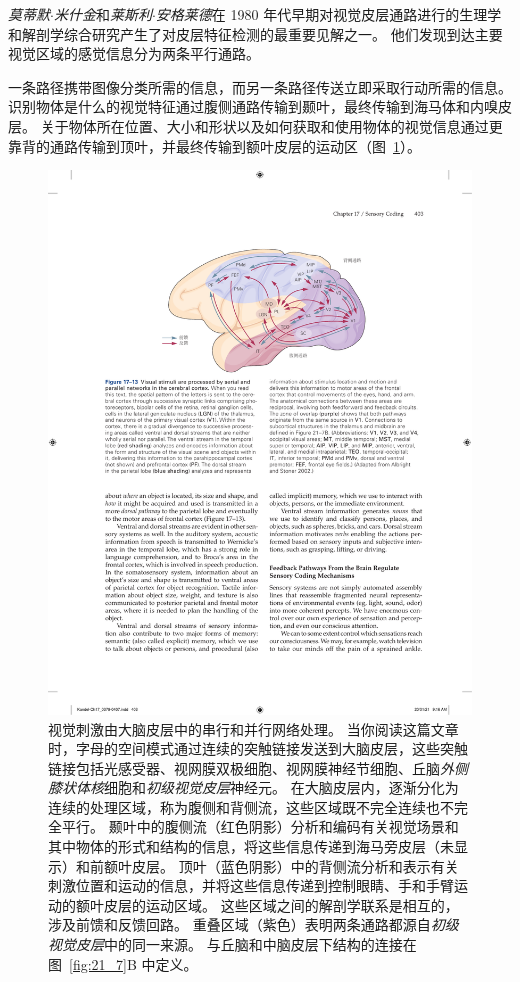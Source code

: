 \textit{莫蒂默$\cdot$米什金}和\textit{莱斯利$\cdot$安格莱德}在 1980 年代早期对视觉皮层通路进行的生理学和解剖学综合研究产生了对皮层特征检测的最重要见解之一。 
他们发现到达主要视觉区域的感觉信息分为两条平行通路。


一条路径携带图像分类所需的信息，而另一条路径传送立即采取行动所需的信息。 
识别物体是什么的视觉特征通过腹侧通路传输到颞叶，最终传输到海马体和内嗅皮层。 
关于物体所在位置、大小和形状以及如何获取和使用物体的视觉信息通过更靠背的通路传输到顶叶，并最终传输到额叶皮层的运动区（图~\ref{fig:17_13}）。


\begin{figure}[htbp]
	\centering
	\includegraphics[width=1.0\linewidth]{chap17/fig_17_13}
	\caption{视觉刺激由大脑皮层中的串行和并行网络处理。 
		当你阅读这篇文章时，字母的空间模式通过连续的突触链接发送到大脑皮层，这些突触链接包括光感受器、视网膜双极细胞、视网膜神经节细胞、丘脑\textit{外侧膝状体核}细胞和\textit{初级视觉皮层}神经元。 
		在大脑皮层内，逐渐分化为连续的处理区域，称为腹侧和背侧流，这些区域既不完全连续也不完全平行。 
		颞叶中的腹侧流（红色阴影）分析和编码有关视觉场景和其中物体的形式和结构的信息，将这些信息传递到海马旁皮层（未显示）和前额叶皮层。
		顶叶（蓝色阴影）中的背侧流分析和表示有关刺激位置和运动的信息，并将这些信息传递到控制眼睛、手和手臂运动的额叶皮层的运动区域。
		这些区域之间的解剖学联系是相互的，涉及前馈和反馈回路。
		重叠区域（紫色）表明两条通路都源自\textit{初级视觉皮层}中的同一来源。
		与丘脑和中脑皮层下结构的连接在图~\ref{fig:21_7}B 中定义\cite{albright2002contextual}。}
	\label{fig:17_13}
\end{figure}


